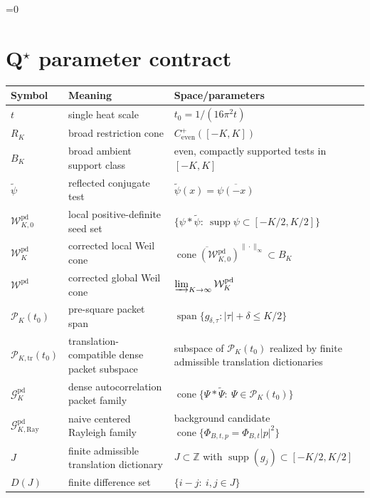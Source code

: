 \providecommand{\qstarcontractloaded}{0}
\ifnum\qstarcontractloaded=0\relax
\gdef\qstarcontractloaded{1}

\section{Q\texorpdfstring{$^\star$}{*} parameter contract}\label{sec:qstar-contract}

\begin{table}[h]
\centering
\begin{tabular}{lll}
\toprule
Symbol & Meaning & Space/parameters \\
\midrule
$t$ & single heat scale & $t_0=1/(16\pi^2 t)$ \\
$R_K$ & broad restriction cone & $C^+_{\mathrm{even}}([-K,K])$ \\
$B_K$ & broad ambient support class & even, compactly supported tests in $[-K,K]$ \\
$\widetilde\psi$ & reflected conjugate test & $\widetilde\psi(x)=\overline{\psi(-x)}$ \\
$\mathcal W_{K,0}^{\mathrm{pd}}$ & local positive-definite seed set & $\{\psi*\widetilde\psi:\ \operatorname{supp}\psi\subset[-K/2,K/2]\}$ \\
$\mathcal W_K^{\mathrm{pd}}$ & corrected local Weil cone & $\overline{\operatorname{cone}(\mathcal W_{K,0}^{\mathrm{pd}})}^{\|\cdot\|_\infty}\subset B_K$ \\
$\mathcal W^{\mathrm{pd}}$ & corrected global Weil cone & $\varinjlim_{K\to\infty}\mathcal W_K^{\mathrm{pd}}$ \\
$\mathcal P_K(t_0)$ & pre-square packet span & $\operatorname{span}\{g_{\delta,\tau}: |\tau|+\delta\le K/2\}$ \\
$\mathcal P_{K,\mathrm{tr}}(t_0)$ & translation-compatible dense packet subspace & subspace of $\mathcal P_K(t_0)$ realized by finite admissible translation dictionaries \\
$\mathcal G_K^{\mathrm{pd}}$ & dense autocorrelation packet family & $\operatorname{cone}\{\Psi*\widetilde\Psi:\ \Psi\in\mathcal P_K(t_0)\}$ \\
$\mathcal G_{K,\mathrm{Ray}}^{\mathrm{pd}}$ & naive centered Rayleigh family & background candidate $\operatorname{cone}\{\Phi_{B,t,p}=\Phi_{B,t}|p|^2\}$ \\
$J$ & finite admissible translation dictionary & $J\subset\mathbb Z$ with $\operatorname{supp}(g_j)\subset[-K/2,K/2]$ \\
$D(J)$ & finite difference set & $\{i-j:\ i,j\in J\}$ \\

\end{tabular}
\end{table}
